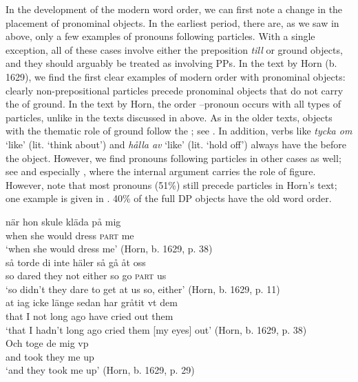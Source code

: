 \documentclass[output=paper]{langscibook}
\begin{document}
In the development of the modern word order, we can first note a change in the placement of pronominal objects. In the earliest period, there are, as we saw in  above, only a few examples of pronouns following particles. With a single exception, all of these cases involve either the preposition \textit{till} or ground objects, and they should arguably be treated as involving PPs. In the text by Horn (b. 1629), we find the first clear examples of modern  order with pronominal objects: clearly non-prepositional particles precede pronominal objects that do not carry the  of ground. In the text by Horn, the order –pronoun occurs with all types of particles, unlike in the texts discussed in  above. As in the older texts, objects with the thematic role of ground follow the ; see . In addition,  verbs like \textit{tycka om} ‘like’ (lit. ‘think about’) and \textit{hålla av} ‘like’ (lit. ‘hold off’) always have the  before the object. However, we find pronouns following particles in other cases as well; see  and especially , where the internal argument carries the role of figure. However, note that most pronouns (51\%) still precede particles in Horn’s text; one example is given in . 40\% of the full DP objects have the old word order.


\ea\label{ex:lalu:32}
\ea\label{ex:lalu:32a}
\gll  när   hon   skule     kläda  på   mig\\
    when   she   would   dress    \textsc{part}   me\\
\glt `when she would dress me’ (Horn, b. 1629, p. 38)\\

\ex\label{ex:lalu:32b}
\gll  så   torde     di     inte   häler     så  gå    åt     oss\\
    so   dared   they   not   either   so  go    \textsc{part}   us\\
\glt `so didn’t they dare to get at us so, either’ (Horn, b. 1629, p. 11)\\
\ex\label{ex:lalu:32c}
\gll at       iag   icke   länge   sedan   har   gråtit   vt     dem \\
    that    I     not   long     ago     have   cried     out   them\\
\glt `that I hadn’t long ago cried them [my eyes] out’ (Horn, b. 1629, p. 38)\\
\z
\ex\label{ex:lalu:33}
\gll  Och       toge   de     mig   vp \\
and     took   they   me   up\\
\glt `and they took me up’ (Horn, b. 1629, p. 29)\\
\z
\end{document}
